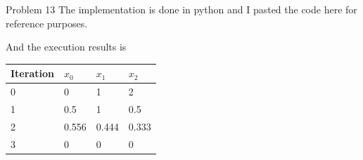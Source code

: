 \documentclass[12pt]{article}
\begin{document}
\begin{section}{Problem 13}
    The implementation is done in python and I pasted the code here for reference purposes. 
    
    
    And the execution results is 

   	\begin{tabular}{llll}
   		\hline
   		Iteration & $x_0$ & $x_1$& $x_2$ \\
   		\hline\hline
   		0 & 0     & 1     & 2     \\
   		1 & 0.5   & 1     & 0.5   \\
   		2 & 0.556 & 0.444 & 0.333 \\
   		3 & 0     & 0     & 0    
   	\end{tabular}

\end{section}
\end{document}
